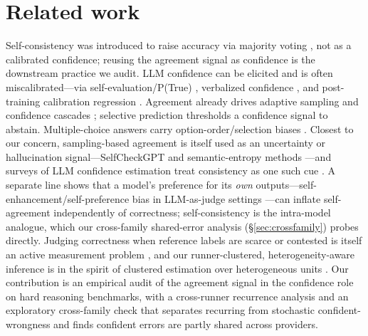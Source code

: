 \documentclass[11pt]{article}
\begin{document}
\section{Related work}
\label{sec:related}
Self-consistency was introduced to raise accuracy via majority voting \citep{wang2023selfconsistency},
not as a calibrated confidence; reusing the agreement signal as confidence is the downstream practice
we audit. LLM confidence can be elicited and is often miscalibrated---via self-evaluation/P(True)
\citep{kadavath2022know}, verbalized confidence \citep{lin2022teaching,tian2023justask}, and
post-training calibration regression \citep{openai2023gpt4}. Agreement already drives adaptive sampling
\citep{aggarwal2023adaptive} and confidence cascades \citep{chen2023frugalgpt}; selective prediction
\citep{geifman2017selective,kamath2020selective} thresholds a confidence signal to abstain.
Multiple-choice answers carry option-order/selection biases
\citep{zheng2024mcq,wei2024selection,pezeshkpour2024sensitivity}. Closest to our concern, sampling-based
agreement is itself used as an uncertainty or hallucination signal---SelfCheckGPT
\citep{manakul2023selfcheckgpt} and semantic-entropy methods \citep{kuhn2023semantic,farquhar2024semantic}---and
surveys of LLM confidence estimation treat consistency as one such cue \citep{geng2024survey,xiong2024canllms}.
A separate line shows that a model's preference for its \emph{own} outputs---self-enhancement/self-preference
bias in LLM-as-judge settings \citep{zheng2023judging,panickssery2024llmevaluators}---can inflate
self-agreement independently of correctness; self-consistency is the intra-model analogue, which our
cross-family shared-error analysis (\S\ref{sec:crossfamily}) probes directly. Judging correctness when
reference labels are scarce or contested is itself an active measurement problem
\citep{ding2025variance}, and our runner-clustered, heterogeneity-aware inference is in the spirit of
clustered estimation over heterogeneous units \citep{ding2024causal,ding2025causal}. Our contribution is an
empirical audit of the agreement signal in the confidence role on hard reasoning benchmarks, with a
cross-runner recurrence analysis and an exploratory cross-family check that separates recurring from
stochastic confident-wrongness and finds confident errors are partly shared across providers.
\end{document}
